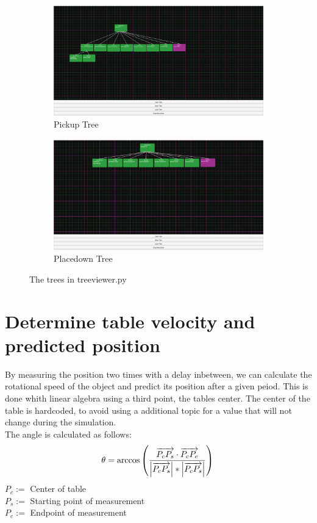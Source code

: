 \documentclass[report]{iisthesis}
\begin{document}
\begin{figure}[h]
    \begin{subfigure}[b]{.45\linewidth}
        \includegraphics[width=\linewidth]{pickupTree.png}
        \caption{Pickup Tree}
    \end{subfigure}
    \begin{subfigure}[b]{.45\linewidth}
        \includegraphics[width=\linewidth]{placedownTree.png}
        \caption{Placedown Tree}
    \end{subfigure}
    \caption{The trees in treeviewer.py}
\end{figure}

\section{Determine table velocity and predicted position}
By measuring the position two times with a delay inbetween, we can calculate the rotational speed of the object and predict its position after a given peiod.
This is done whith linear algebra using a third point, the tables center. The center of the table is hardcoded, to avoid using a additional topic for a value that will not change during the simulation. \\
The angle is calculated as follows:
$$
\theta = \arccos \left ( \frac{\overrightarrow{P_cP_s} \cdot \overrightarrow{P_cP_e}}{\left | \overrightarrow{P_cP_s} \right | * \left | \overrightarrow{P_cP_s} \right |} \right) \\
$$
$P_c :=$ Center of table \\
$P_s :=$ Starting point of measurement \\
$P_e :=$ Endpoint of measurement \\
\end{document}
